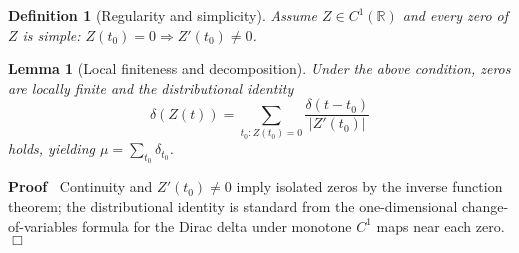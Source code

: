 \documentclass{article}
\newenvironment{proof}{\noindent\textbf{Proof\ }}{\hspace*{\fill}$\Box$\medskip}
\newtheorem{definition}{Definition}
\newtheorem{lemma}{Lemma}
\begin{document}
\begin{definition}
  [Regularity and simplicity] Assume $Z \in C^1 (\mathbb{R})$ and every zero
  of $Z$ is simple: $Z (t_0) = 0 \Longrightarrow Z' (t_0) \neq 0$.
\end{definition}

\begin{lemma}
  [Local finiteness and decomposition] Under the above condition, zeros are
  locally finite and the distributional identity
  \begin{equation}
    \delta (Z (t)) = \sum_{t_0 : Z (t_0) = 0} \frac{\delta (t - t_0)}{|Z'
    (t_0) |}
  \end{equation}
  holds, yielding $\mu = \sum_{t_0} \delta_{t_0}$.
\end{lemma}

\begin{proof}
  Continuity and $Z' (t_0) \neq 0$ imply isolated zeros by the inverse
  function theorem; the distributional identity is standard from the
  one-dimensional change-of-variables formula for the Dirac delta under
  monotone $C^1$ maps near each zero.
\end{proof}
\end{document}

